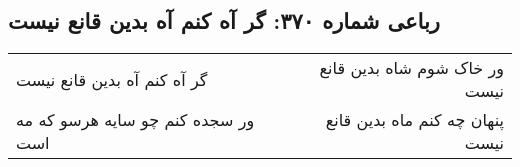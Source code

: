 \begin{center}
\section*{رباعی شماره ۳۷۰: گر آه کنم آه بدین قانع نیست}
\label{sec:0370}
\begin{longtable}{l p{0.5cm} r}
گر آه کنم آه بدین قانع نیست
&&
ور خاک شوم شاه بدین قانع نیست
\\
ور سجده کنم چو سایه هرسو که مه است
&&
پنهان چه کنم ماه بدین قانع نیست
\\
\end{longtable}
\end{center}
